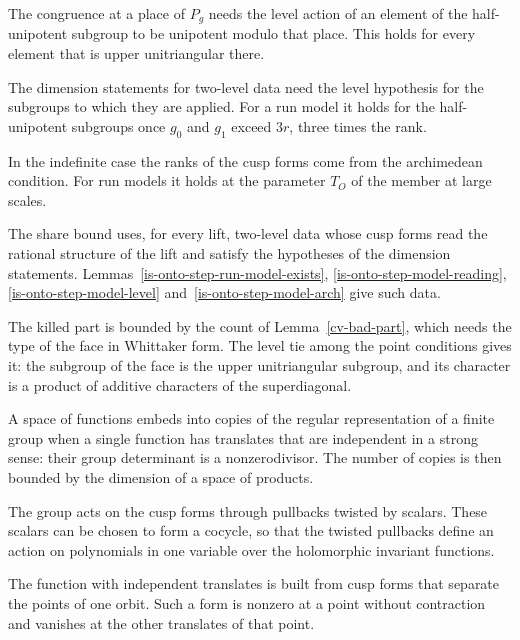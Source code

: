The congruence at a place of $P_g$ needs the level action of an element of the half-unipotent subgroup
to be unipotent modulo that place. This holds for every element that is upper unitriangular there.

The dimension statements for two-level data need the level hypothesis for the subgroups to which
they are applied. For a run model it holds for the half-unipotent subgroups once $g_0$ and $g_1$
exceed $3r$, three times the rank.

In the indefinite case the ranks of the cusp forms come from the archimedean condition. For run
models it holds at the parameter $T_O$ of the member at large scales.

The share bound uses, for every lift, two-level data whose cusp forms read the rational structure of
the lift and satisfy the hypotheses of the dimension statements. Lemmas~\ref{is-onto-step-run-model-exists},
\ref{is-onto-step-model-reading}, \ref{is-onto-step-model-level} and~\ref{is-onto-step-model-arch} give
such data.

The killed part is bounded by the count of Lemma~\ref{cv-bad-part}, which needs the type of the face in
Whittaker form. The level tie among the point conditions gives it: the subgroup of the face is the
upper unitriangular subgroup, and its character is a product of additive characters of the
superdiagonal.

A space of functions embeds into copies of the regular representation of a finite group when a single
function has translates that are independent in a strong sense: their group determinant is a
nonzerodivisor. The number of copies is then bounded by the dimension of a space of products.

The group acts on the cusp forms through pullbacks twisted by scalars. These scalars can be chosen to
form a cocycle, so that the twisted pullbacks define an action on polynomials in one variable over the
holomorphic invariant functions.

The function with independent translates is built from cusp forms that separate the points of one
orbit. Such a form is nonzero at a point without contraction and vanishes at the other translates of
that point.


